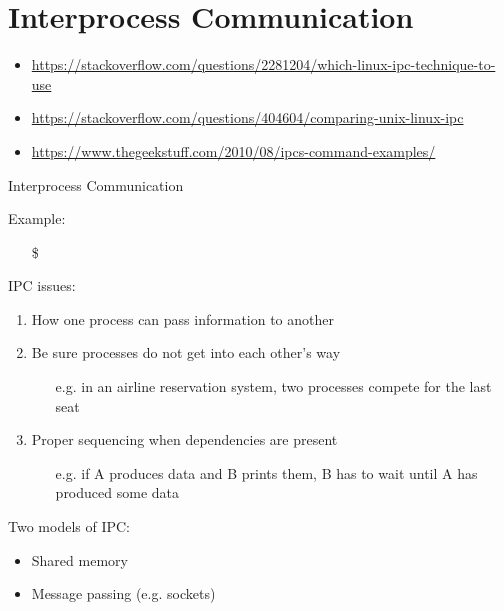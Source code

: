 \mode*
\part{Interprocess Communication}

\begin{itemize}
\item \url{https://stackoverflow.com/questions/2281204/which-linux-ipc-technique-to-use}
\item \url{https://stackoverflow.com/questions/404604/comparing-unix-linux-ipc}
\item \url{https://www.thegeekstuff.com/2010/08/ipcs-command-examples/}
\end{itemize}

\begin{frame}{Interprocess Communication}
  \begin{block}{Example:}
    \begin{itemize}
    \item[\$] 
    \end{itemize}
  \end{block}
  \begin{block}{IPC issues:}
    \begin{enumerate}
    \item How one process can pass information to another
    \item Be sure processes do not get into each other's way
      \begin{itemize}
      \item[e.g.] in an airline reservation system, two processes compete for the last
        seat
      \end{itemize}
    \item Proper sequencing when dependencies are present
      \begin{itemize}
      \item[e.g.] if A produces data and B prints them, B has to wait until A has produced
        some data
      \end{itemize}
    \end{enumerate}
  \end{block}
  \begin{block}{Two models of IPC:}
    \begin{itemize}
    \item Shared memory
    \item Message passing (e.g. sockets)
    \end{itemize}
  \end{block}
\end{frame}

